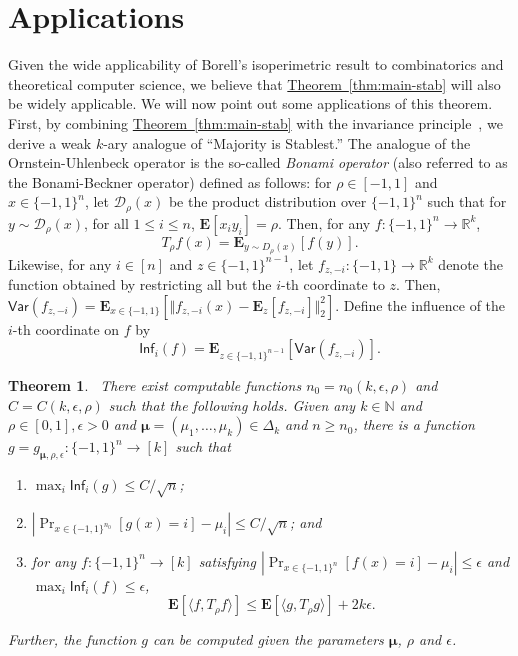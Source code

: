 \documentclass[11pt]{article}
\numberwithin{equation}{section}
\newtheorem{theorem}{Theorem}[section]
\theoremstyle{definition}
\theoremstyle{plain}
\newcommand{\expref}[2]{\hyperref[#2]{#1~\ref{#2}}}
\begin{document}
\section{Applications} 

Given the wide applicability of Borell's isoperimetric result to combinatorics and theoretical computer science, we believe that \expref{Theorem}{thm:main-stab} will also be widely applicable. We will now point out some applications of this theorem. First, by combining \expref{Theorem}{thm:main-stab} with the invariance principle~\cite{MOO10}, we  
derive a weak $k$-ary analogue of ``Majority is Stablest.''
The analogue of the Ornstein-Uhlenbeck operator is the so-called
\emph{Bonami operator}
%
%
(also referred to  %
as the Bonami-Beckner operator) defined as follows: for $\rho \in [-1,1]$ and $x
\in \{-1,1\}^n$, let $\mathcal{D}_{\rho}(x)$ be the product distribution over
$\{-1,1\}^n$ such that for $y \sim \mathcal{D}_{\rho}(x)$, for all $1 \le i \le
n$, $\mathbf{E}[x_i y_i] =\rho$. 
Then, for any $f: \{-1,1\}^n \rightarrow \mathbb{R}^k$,
\[
  T_{\rho} f(x) = \mathbf{E}_{y \sim D_{\rho}(x)} [f (y)].
\]
Likewise, for any $i \in [n]$ and $z \in \{-1,1\}^{n-1}$, let
$f_{z,-i}: \{-1,1\} \rightarrow \mathbb{R}^k $ denote the function
obtained by restricting all but the $i$-{th} coordinate to $z$. Then,
$\mathsf{Var}(f_{z,-i}) = \mathbf{E}_{x \in \{-1,1\}}[\Vert
f_{z,-i}(x) - \mathbf{E}_{z}[f_{z,-i}] \Vert_2^2]$.  Define the
influence of the $i$-{th} coordinate on $f$ by
$$
\mathsf{Inf}_i(f)= \mathbf{E}_{z \in \{-1,1\}^{n-1}} [\mathsf{Var}(f_{z,-i})]. 
$$
%

\begin{theorem}~\label{thm:Plurality}
There exist computable functions $n_0 = n_0(k,\epsilon,\rho)$ and
$C = C(k,\epsilon,\rho)$ such that the following holds. 
Given any $k \in \mathbb{N}$ and $\rho \in [0,1],\epsilon>0$ and 
$\boldsymbol{\mu} = (\mu_1, \ldots, \mu_k) \in \Delta_k$ and $n \geq
n_0$, there is a function $g = g_{\boldsymbol{\mu}, \rho, \epsilon}: \{-1,1\}^{n} \rightarrow [k]$ such that
\begin{enumerate}
    \item $\max_i \mathsf{Inf}_i(g) \le C/\sqrt{n}$;
    \item $|\Pr_{x \in \{-1,1\}^{n_0}}[g(x) = i ] - \mu_i| \leq  C / \sqrt{n}$; and
    \item for any $f: \{-1,1\}^n \rightarrow [k]$ satisfying $|\Pr_{x \in
\{-1,1\}^n} [f(x) = i ] - \mu_i| \leq \epsilon$ and $\max_i \mathsf{Inf}_i(f)
\le \epsilon$, 
\[
\mathbf{E}[\langle f, T_{\rho} f \rangle] \le \mathbf{E}[\langle g, T_{\rho} g \rangle] + 2 k \epsilon. 
\]
\end{enumerate}
Further, the function $g$ can be computed given the parameters $\boldsymbol{\mu}$, $\rho$ and $\epsilon$. 
\end{theorem}
\end{document}
